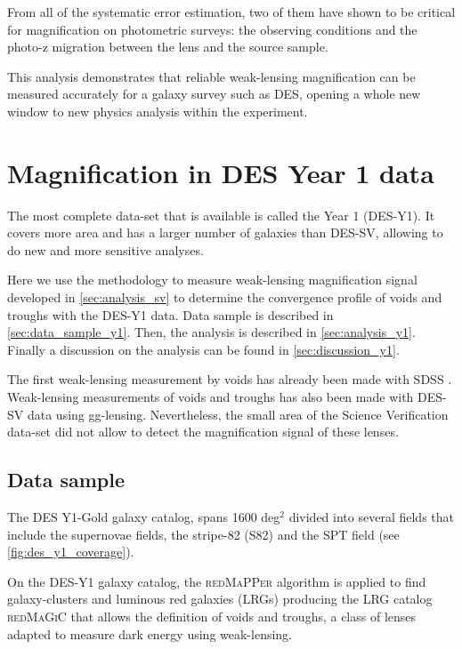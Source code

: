 From all of the systematic error estimation, two of them have shown to be critical for magnification on photometric surveys: the observing conditions and the photo-z migration between the lens and the source sample.
\newline

This analysis demonstrates that reliable weak-lensing magnification can be measured accurately for a galaxy survey such as DES, opening a whole new window to new physics analysis within the experiment.


\section{Magnification in DES Year 1 data}
\label{sec:y1data}
The most complete data-set that is available is called the Year 1 (DES-Y1). It covers more area and has a larger number of galaxies than DES-SV, allowing to do new and more sensitive analyses.
\newline

Here we use the methodology to measure weak-lensing magnification signal developed in \autoref{sec:analysis_sv} to determine the convergence profile of voids and troughs with the DES-Y1 data. Data sample is described in \autoref{sec:data_sample_y1}. Then, the analysis is described in \autoref{sec:analysis_y1}. Finally a discussion on the analysis can be found in \autoref{sec:discussion_y1}.
\newline

The first weak-lensing measurement by voids has already been made with SDSS \cite{2014MNRAS.440.2922M}. Weak-lensing measurements of voids and troughs has also been made with DES-SV data \cite{2016MNRAS.455.3367G,2017MNRAS.465..746S} using gg-lensing. Nevertheless, the small area of the Science Verification data-set did not allow to detect the magnification signal of these lenses.

\subsection{Data sample}
\label{sec:data_sample_y1}
The DES Y1-Gold galaxy catalog, spans 1600 deg$^2$ divided into several fields that include the supernovae fields, the stripe-82 (S82) and the SPT field (see \autoref{fig:des_y1_coverage}).
\newline

On the DES-Y1 galaxy catalog, the {\scshape redMaPPer} algorithm \cite{2014ApJ...785..104R} is applied to find galaxy-clusters and luminous red galaxies (LRGs) \cite{2016MNRAS.461.1431R,2016ApJS..224....1R} producing the LRG catalog {\scshape redMaGiC} that allows the definition of voids and troughs, a class of lenses adapted to measure dark energy using weak-lensing.
\newline

